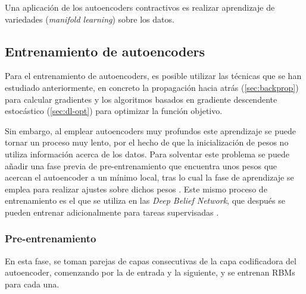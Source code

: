 Una aplicación de los autoencoders contractivos es realizar aprendizaje de variedades (\textit{manifold learning}) sobre los datos.


\subsection{Entrenamiento de
  autoencoders}\label{entrenamiento-de-autoencoders}

Para el entrenamiento de autoencoders, es posible utilizar las técnicas que se han estudiado anteriormente, en concreto la propagación hacia atrás (\autoref{sec:backprop}) para calcular gradientes y los algoritmos basados en gradiente descendente estocástico (\autoref{sec:dl-opt}) para optimizar la función objetivo.

Sin embargo, al emplear autoencoders muy profundos este aprendizaje se puede tornar un proceso muy lento, por el hecho de que la inicialización de pesos no utiliza información acerca de los datos. Para solventar este problema se puede añadir una fase previa de pre-entrenamiento que encuentra unos pesos que acercan el autoencoder a un mínimo local, tras lo cual la fase de aprendizaje se emplea para realizar ajustes sobre dichos pesos \autocite{hinton2006autoencoder}. Este mismo proceso de entrenamiento es el que se utiliza en las \textit{Deep Belief Network}, que después se pueden entrenar adicionalmente para tareas supervisadas \autocite{hinton2006dbn}.

\subsubsection{Pre-entrenamiento}\label{pre-entrenamiento}

En esta fase, se toman parejas de capas consecutivas de la capa codificadora del autoencoder, comenzando por la de entrada y la siguiente, y se entrenan RBMs para cada una.

